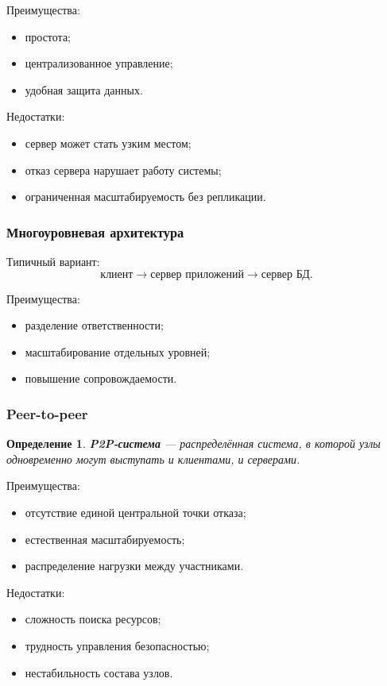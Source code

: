 \documentclass[12pt,a4paper]{article}
\newtheorem{definition}{Определение}
\begin{document}
Преимущества:
\begin{itemize}
    \item простота;
    \item централизованное управление;
    \item удобная защита данных.
\end{itemize}

Недостатки:
\begin{itemize}
    \item сервер может стать узким местом;
    \item отказ сервера нарушает работу системы;
    \item ограниченная масштабируемость без репликации.
\end{itemize}

\subsubsection{Многоуровневая архитектура}

Типичный вариант:
\[
\text{клиент} \rightarrow \text{сервер приложений} \rightarrow \text{сервер БД}.
\]

Преимущества:
\begin{itemize}
    \item разделение ответственности;
    \item масштабирование отдельных уровней;
    \item повышение сопровождаемости.
\end{itemize}

\subsubsection{Peer-to-peer}

\begin{definition}
\textbf{P2P-система} --- распределённая система, в которой узлы одновременно могут выступать и клиентами, и серверами.
\end{definition}

Преимущества:
\begin{itemize}
    \item отсутствие единой центральной точки отказа;
    \item естественная масштабируемость;
    \item распределение нагрузки между участниками.
\end{itemize}

Недостатки:
\begin{itemize}
    \item сложность поиска ресурсов;
    \item трудность управления безопасностью;
    \item нестабильность состава узлов.
\end{itemize}
\end{document}
